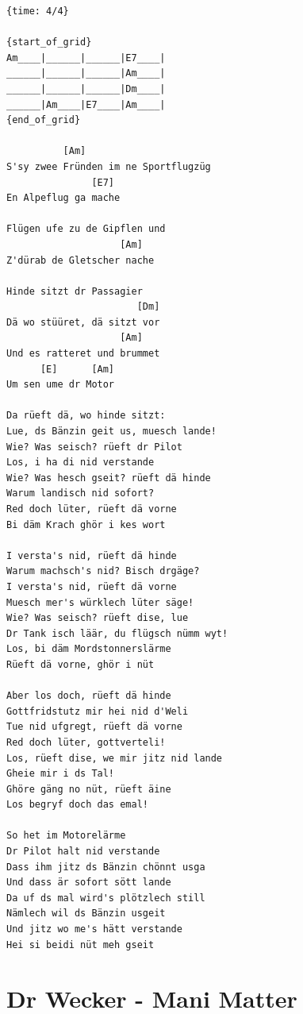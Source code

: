 \documentclass[]{book}
\let\stdsection\section
\renewcommand\section{\clearpage\stdsection}
\begin{document}
\begin{verbatim}
{time: 4/4}

{start_of_grid}
Am____|______|______|E7____|
______|______|______|Am____|
______|______|______|Dm____|
______|Am____|E7____|Am____|
{end_of_grid}

          [Am]
S'sy zwee Fründen im ne Sportflugzüg
               [E7]
En Alpeflug ga mache

Flügen ufe zu de Gipflen und
                    [Am]
Z'dürab de Gletscher nache

Hinde sitzt dr Passagier
                       [Dm]
Dä wo stüüret, dä sitzt vor
                    [Am]
Und es ratteret und brummet
      [E]      [Am]
Um sen ume dr Motor

Da rüeft dä, wo hinde sitzt:
Lue, ds Bänzin geit us, muesch lande!
Wie? Was seisch? rüeft dr Pilot
Los, i ha di nid verstande
Wie? Was hesch gseit? rüeft dä hinde
Warum landisch nid sofort?
Red doch lüter, rüeft dä vorne
Bi däm Krach ghör i kes wort

I versta's nid, rüeft dä hinde
Warum machsch's nid? Bisch drgäge?
I versta's nid, rüeft dä vorne
Muesch mer's würklech lüter säge!
Wie? Was seisch? rüeft dise, lue
Dr Tank isch läär, du flügsch nümm wyt!
Los, bi däm Mordstonnerslärme
Rüeft dä vorne, ghör i nüt

Aber los doch, rüeft dä hinde
Gottfridstutz mir hei nid d'Weli
Tue nid ufgregt, rüeft dä vorne
Red doch lüter, gottverteli!
Los, rüeft dise, we mir jitz nid lande
Gheie mir i ds Tal!
Ghöre gäng no nüt, rüeft äine
Los begryf doch das emal!

So het im Motorelärme
Dr Pilot halt nid verstande
Dass ihm jitz ds Bänzin chönnt usga
Und dass är sofort sött lande
Da uf ds mal wird's plötzlech still
Nämlech wil ds Bänzin usgeit
Und jitz wo me's hätt verstande
Hei si beidi nüt meh gseit 

\end{verbatim}

\hypertarget{dr-wecker---mani-matter}{%
\section{Dr Wecker - Mani Matter}\label{dr-wecker---mani-matter}}
\end{document}
